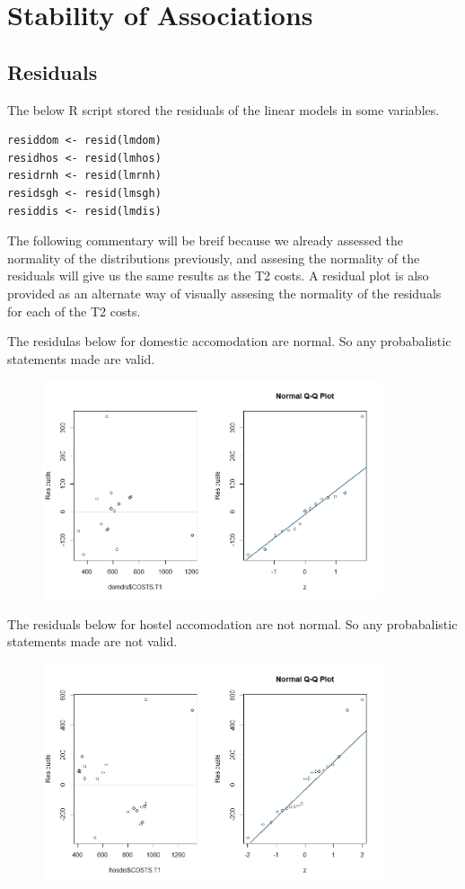 \documentclass[]{article}
\begin{document}
\section{Stability of Associations}
\subsection{Residuals}
The below R script stored the residuals of the linear models in some variables.
\begin{lstlisting}
residdom <- resid(lmdom)
residhos <- resid(lmhos)
residrnh <- resid(lmrnh)
residsgh <- resid(lmsgh)
residdis <- resid(lmdis)
\end{lstlisting}
\begin{flushleft}
The following commentary will be breif because we already assessed the normality of the distributions previously, and assesing the normality of the residuals will give us the same results as the T2 costs. A residual plot is also provided as an alternate way of visually assesing the normality of the residuals for each of the T2 costs.
\end{flushleft}
The residulas below for domestic accomodation are normal. So any probabalistic statements made are valid.
\begin{figure}[H]
\centering
\includegraphics[width=10cm]{RStudio/jpeg/Res_DOM.jpeg}
\end{figure}
The residuals below for hostel accomodation are not normal. So any probabalistic statements made are not valid.
\begin{figure}[H]
\centering
\includegraphics[width=10cm]{RStudio/jpeg/Res_HOS.jpeg}
\end{figure}
\end{document}
